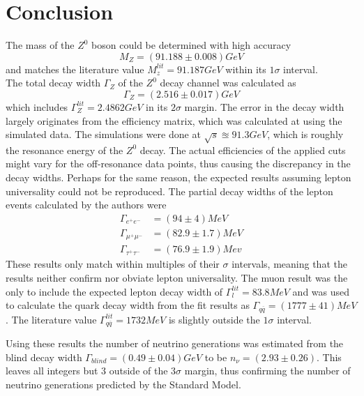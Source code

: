 \newpage
\section{Conclusion}
The mass of the $Z^0$ boson could be determined with high accuracy
\begin{equation*}
	M_Z=\unit{(91.188\pm0.008)}{GeV}
\end{equation*}
and matches the literature value $M_z^{lit}=\unit{91.187}{GeV}$ within its $1\sigma$ interval.\\
The total decay width $\Gamma_Z$ of the $Z^0$ decay channel was calculated as
\begin{equation*}
\Gamma_Z=\unit{(2.516\pm0.017)}{GeV}
\end{equation*}
which includes $\Gamma_Z^{lit}=\unit{2.4862}{GeV}$ in its $2\sigma$ margin. The error in the decay width largely originates from the efficiency matrix, which was calculated at using the simulated data. The simulations were done at $\sqrt{s}\approxeq\unit{91.3}{GeV}$, which is roughly the resonance energy of the $Z^0$ decay. The actual efficiencies of the applied cuts might vary for the off-resonance data points, thus causing the discrepancy in the decay widths.
Perhaps for the same reason, the expected results assuming lepton universality could not be reproduced. The partial decay widths of the lepton events calculated by the authors were 
\begin{equation*}
\begin{aligned}
\Gamma_{e^+e^-}&=\unit{(94\pm4)}{MeV}\\
\Gamma_{\mu^+\mu^-}&=\unit{(82.9\pm1.7)}{MeV}\\
\Gamma_{\tau^+\tau^-}&=\unit{(76.9\pm1.9)}{Mev}
\end{aligned}
\end{equation*}
These results only match within multiples of their $\sigma$ intervals, meaning that the results neither confirm nor obviate lepton universality. The muon result was the only to include the expected lepton decay width of $\Gamma_l^{lit}=\unit{83.8}{MeV}$ \cite{staatsex} and was used to calculate the quark decay width from the fit results as $\Gamma_{q\overline{q}}=\unit{(1777\pm41)}{MeV}$. The literature value $\Gamma_{q\overline{q}}^{lit}=\unit{1732}{MeV}$ is slightly outside the $1\sigma$ interval.

Using these results the number of neutrino generations was estimated from the blind decay width $\Gamma_{blind}=\unit{(0.49\pm0.04)}{GeV}$ to be $n_\nu=(2.93\pm0.26)$. This leaves all integers but 3 outside of the $3\sigma$ margin, thus confirming the number of neutrino generations predicted by the Standard Model.